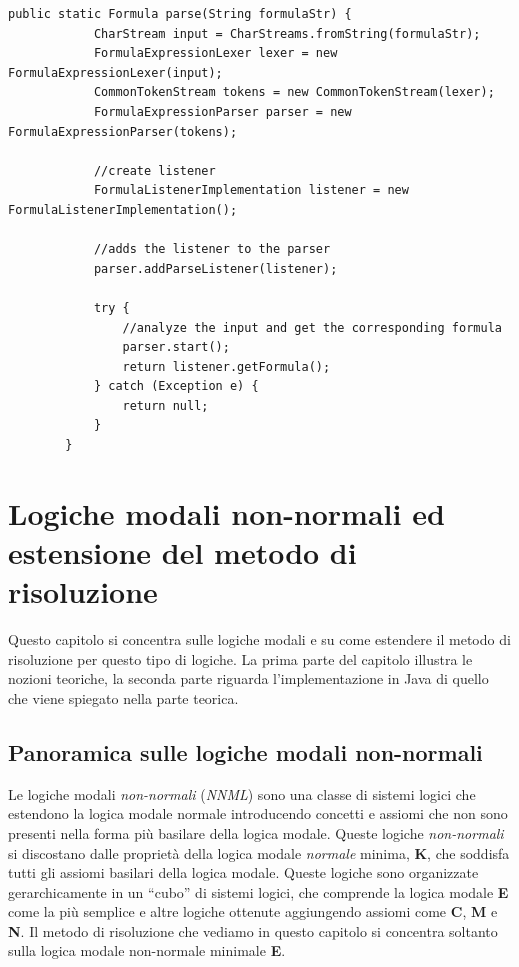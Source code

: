 \documentclass[a4paper,12pt]{report}
\begin{document}
\begin{minipage}{\linewidth}
    \begin{lstlisting}[caption={Metodo \texttt{parse} della classe \texttt{ParseFormula}}, label={parse}]
        public static Formula parse(String formulaStr) {
            CharStream input = CharStreams.fromString(formulaStr);
            FormulaExpressionLexer lexer = new FormulaExpressionLexer(input);
            CommonTokenStream tokens = new CommonTokenStream(lexer);
            FormulaExpressionParser parser = new FormulaExpressionParser(tokens);

            //create listener
            FormulaListenerImplementation listener = new FormulaListenerImplementation();

            //adds the listener to the parser
            parser.addParseListener(listener);

            try {
                //analyze the input and get the corresponding formula
                parser.start();
                return listener.getFormula();
            } catch (Exception e) {
                return null;
            }
        }
    \end{lstlisting}
\end{minipage}


% 
% 
\chapter{Logiche modali non-normali ed estensione del metodo di risoluzione}
\label{modal}
Questo capitolo si concentra sulle logiche modali e su come estendere il metodo di risoluzione per questo tipo di logiche. La prima parte del capitolo illustra le nozioni teoriche, la seconda parte riguarda l'implementazione in Java di quello che viene spiegato nella parte teorica. 

\section{Panoramica sulle logiche modali non-normali}
Le logiche modali \emph{non-normali} (\emph{NNML}) sono una classe di sistemi logici che estendono la logica modale normale introducendo concetti e assiomi che non sono presenti nella forma più basilare della logica modale. Queste logiche \emph{non-normali} si discostano dalle proprietà della logica modale \emph{normale} minima, \textbf{K}, che soddisfa tutti gli assiomi basilari della logica modale. Queste logiche sono organizzate gerarchicamente in un ``cubo'' di sistemi logici, che comprende la logica modale \textbf{E} come la più semplice e altre logiche ottenute aggiungendo assiomi come \textbf{C}, \textbf{M} e \textbf{N}. Il metodo di risoluzione che vediamo in questo capitolo si concentra soltanto sulla logica modale non-normale minimale \textbf{E}.
\end{document}
